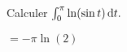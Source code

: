 \begin{exercice}
    Calculer $\int_0^\pi \ln(\sin t) \, \mathrm{d} t.$
\end{exercice}

\begin{elem_sol}
    $=-\pi \ln(2)$
\end{elem_sol}